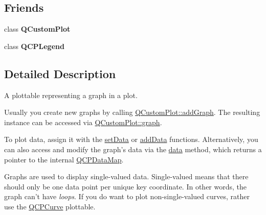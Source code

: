 \subsection*{\-Friends}
\begin{DoxyCompactItemize}
\item 
\hypertarget{classQCPGraph_a1cdf9df76adcfae45261690aa0ca2198}{class {\bfseries \-Q\-Custom\-Plot}}\label{classQCPGraph_a1cdf9df76adcfae45261690aa0ca2198}

\item 
\hypertarget{classQCPGraph_a8429035e7adfbd7f05805a6530ad5e3b}{class {\bfseries \-Q\-C\-P\-Legend}}\label{classQCPGraph_a8429035e7adfbd7f05805a6530ad5e3b}

\end{DoxyCompactItemize}


\subsection{\-Detailed \-Description}
\-A plottable representing a graph in a plot. 



\-Usually you create new graphs by calling \hyperlink{classQCustomPlot_a6fb2873d35a8a8089842d81a70a54167}{\-Q\-Custom\-Plot\-::add\-Graph}. \-The resulting instance can be accessed via \hyperlink{classQCustomPlot_a6d3ed93c2bf46ab7fa670d66be4cddaf}{\-Q\-Custom\-Plot\-::graph}.

\-To plot data, assign it with the \hyperlink{classQCPGraph_a1df2fd710545c8ba3b2c99a39a27bf8b}{set\-Data} or \hyperlink{classQCPGraph_aa5c6181d84db72ce4dbe9dc15a34ef4f}{add\-Data} functions. \-Alternatively, you can also access and modify the graph's data via the \hyperlink{classQCPGraph_a2f58436df4f86a2792b776a21642b3d9}{data} method, which returns a pointer to the internal \hyperlink{qcustomplot_8h_a84a9c4a4c2216ccfdcb5f3067cda76e3}{\-Q\-C\-P\-Data\-Map}.

\-Graphs are used to display single-\/valued data. \-Single-\/valued means that there should only be one data point per unique key coordinate. \-In other words, the graph can't have {\itshape loops\/}. \-If you do want to plot non-\/single-\/valued curves, rather use the \hyperlink{classQCPCurve}{\-Q\-C\-P\-Curve} plottable.

